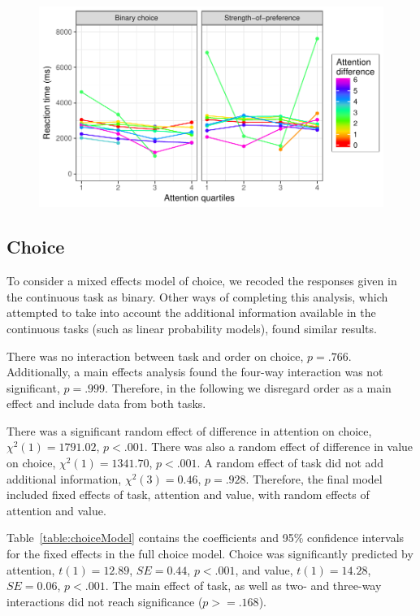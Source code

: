 \documentclass[12pt]{article}
\begin{document}
\begin{figure}
	\centering
	\includegraphics{images/RTattentionValueGraph}
	\caption{}
	\label{figure:RTattentionValueGraph}
\end{figure}

\subsection{Choice}
To consider a mixed effects model of choice, we recoded the responses given in the continuous task as binary. Other ways of completing this analysis, which attempted to take into account the additional information available in the continuous tasks (such as linear probability models), found similar results. 

There was no interaction between task and order on choice, $p=.766$. Additionally, a main effects analysis found the four-way interaction was not significant, $p=.999$. Therefore, in the following we disregard order as a main effect and include data from both tasks. 

There was a significant random effect of difference in attention on choice, $\chi^2(1)=1791.02$, $p<.001$. There was also a random effect of difference in value on choice, $\chi^2(1)=1341.70$, $p<.001$. A random effect of task did not add additional information, $\chi^2(3)=0.46$, $p=.928$. Therefore, the final model included fixed effects of task, attention and value, with random effects of attention and value.

 

Table~\ref{table:choiceModel} contains the coefficients and 95\% confidence intervals for the fixed effects in the full choice model. Choice was significantly predicted by attention, $t(1)=12.89$, $SE=0.44$, $p<.001$, and value, $t(1)=14.28$, $SE=0.06$, $p<.001$. The main effect of task, as well as two- and three-way interactions did not reach significance ($p>=.168$).
\end{document}
